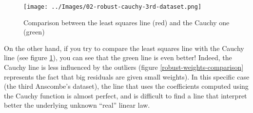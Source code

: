     \begin{figure}
        \centering
        \texttt{[image: ../Images/02-robust-cauchy-3rd-dataset.png]}
        \caption{Comparison between the least squares line (red) and the Cauchy one (green)}
        \label{least-square-cauchy-lines-comparison}
    \end{figure}
    On the other hand, if you try to compare the least squares line with the Cauchy line (see figure \ref{least-square-cauchy-lines-comparison}), you can see that the green line is even better! Indeed, the Cauchy line is less influenced by the outliers (figure \ref{robust-weights-comparison} represents the fact that big residuals are given small weights). In this specific case (the third Anscombe's dataset), the line that uses the coefficients computed using the Cauchy function is almost perfect, and is difficult to find a line that interpret better the underlying unknown ``real'' linear law.